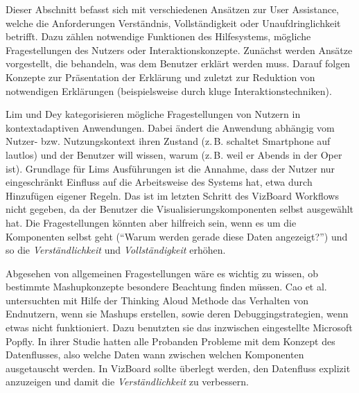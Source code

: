 \documentclass[
	headsepline,
	footsepline,
	fontsize=12pt,
	bibliography=totoc
]{scrbook}
\begin{document}
Dieser Abschnitt befasst sich mit verschiedenen Ansätzen zur User Assistance, welche die Anforderungen Verständnis, Vollständigkeit oder Unaufdringlichkeit betrifft. Dazu zählen notwendige Funktionen des Hilfesystems, mögliche Fragestellungen des Nutzers oder Interaktionskonzepte. Zunächst werden Ansätze vorgestellt, die behandeln, was dem Benutzer erklärt werden muss. Darauf folgen Konzepte zur Präsentation der Erklärung und zuletzt zur Reduktion von notwendigen Erklärungen (beispielsweise durch kluge Interaktionstechniken).



Lim und Dey \cite{Lim2009} kategorisieren mögliche Fragestellungen von Nutzern in kontextadaptiven Anwendungen. Dabei ändert die Anwendung abhängig vom Nutzer- bzw. Nutzungskontext ihren Zustand (z.\,B. schaltet Smartphone auf lautlos) und der Benutzer will wissen, warum (z.\,B. weil er Abends in der Oper ist). Grundlage für Lims Ausführungen ist die Annahme, dass der Nutzer nur eingeschränkt Einfluss auf die Arbeitsweise des Systems hat, etwa durch Hinzufügen eigener Regeln. Das ist im letzten Schritt des VizBoard Workflows nicht gegeben, da der Benutzer die Visualisierungskomponenten selbst ausgewählt hat. Die Fragestellungen könnten aber hilfreich sein, wenn es um die Komponenten selbst geht (\enquote{Warum werden gerade diese Daten angezeigt?}) und so die \emph{Verständlichkeit} und \emph{Vollständigkeit} erhöhen.


Abgesehen von allgemeinen Fragestellungen wäre es wichtig zu wissen, ob bestimmte Mashupkonzepte besondere Beachtung finden müssen. Cao et al. \cite{Cao2010} untersuchten mit Hilfe der Thinking Aloud Methode \cite{vanSomeren1994} das Verhalten von Endnutzern, wenn sie Mashups erstellen, sowie deren Debuggingstrategien, wenn etwas nicht funktioniert. Dazu benutzten sie das inzwischen eingestellte Microsoft Popfly. In ihrer Studie hatten alle Probanden Probleme mit dem Konzept des Datenflusses, also welche Daten wann zwischen welchen Komponenten ausgetauscht werden. In VizBoard sollte überlegt werden, den Datenfluss explizit anzuzeigen und damit die \emph{Verständlichkeit} zu verbessern.

\end{document}
